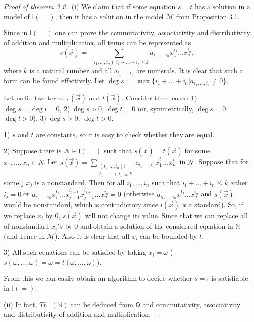 \documentclass[a4paper,14pt]{article}
\theoremstyle{definition}
\theoremstyle{theorem}
\theoremstyle{lemma}
\theoremstyle{proposition}
\theoremstyle{remark}
\theoremstyle{corollary}
\theoremstyle{problem}
\theoremstyle{hypothesis}
\begin{document}
\begin{proof}[Proof of theorem 3.2.]
    (i) We claim that if some equation $s = t$ has a solution in a model of $\mathsf I(=)$, then it has a solution in the model $\mathcal M$ from Proposition 3.1. 
    
    Since in $\mathsf I(=)$ one can prove the commutativity, associativity and distributivity of addition and multiplication, all terms can be represented as 
    $$s(\vec x) = \sum\limits_{(i_1, \dots, i_n): i_1 + \dots + i_n \leqslant k} a_{i_1, \dots, i_n} x_1^{i_1} \dots x_n^{i_n},$$ 
    where $k$ is a natural number and all $a_{i_1, \dots, i_n}$ are numerals. It is clear that such a form can be found effectively. Let $\deg s := \max\{i_1 + \dots + i_n | a_{i_1, \dots, i_n} \ne 0\}$.
    
    Let us fix two terms $s(\vec x)$ and $t(\vec x)$. Consider three cases: 1) $\deg s = \deg t = 0$, 2) $\deg s > 0$, $\deg t = 0$ (or, symmetrically, $\deg s = 0$, $\deg t > 0$), 3) $\deg s > 0$, $\deg t > 0$.
    
    1) $s$ and $t$ are constants, so it is easy to check whether they are equal.
    
    2) Suppose there is $\mathcal N \vDash \mathsf I(=)$ such that $s(\vec x) = t(\vec x)$ for some $x_1, \dots, x_n \in N$. Let $s(\vec x) = \sum\limits_{\substack{(i_1, \dots, i_n): \\ i_1 + \dots + i_n \leqslant k}} a_{i_1, \dots, i_n} x_1^{i_1} \dots x_n^{i_n}$ in $\mathcal N$. Suppose that for some $j$ $x_j$ is a nonstandard. Then for all $i_1, \dots, i_n$ such that $i_1 + \dots + i_n \leqslant k$ either $i_j = 0$ or $a_{i_1, \dots, i_n} x_i^{i_1} \dots x_{j - 1}^{i_{j - 1}} x_{j + 1}^{i_{j + 1}} \dots x_{n}^{i_n} = 0$ (otherwise $a_{i_1, \dots, i_n} x_1^{i_1} \dots x_n^{i_n}$ and $s(\vec x)$ would be nonstandard, which is contradictory since $t(\vec x)$ is a standard). So, if we replace $x_i$ by $0$, $s(\vec x)$ will not change its value. Since that we can replace all of nonstandard $x_i's$ by $0$ and obtain a solution of the considered equation in $\mathbb N$ (and hence in $\mathcal M$). Also it is clear that all $x_i$ can be bounded by $t$.
    
    3) All such equations can be satisfied by taking $x_i = \omega$ ($s(\omega, \dots, \omega) = \omega = t(\omega, \dots, \omega)$).
    
    From this we can easily obtain an algorithm to decide whether $s = t$ is satisfiable in $\mathsf I(=)$.
    
    (ii) In fact, $Th_=(\mathbb N)$ can be deduced from $\mathsf Q$ and commutativity, associativity and distributivity of addition and multiplication. 
    

\end{proof}
\end{document}
